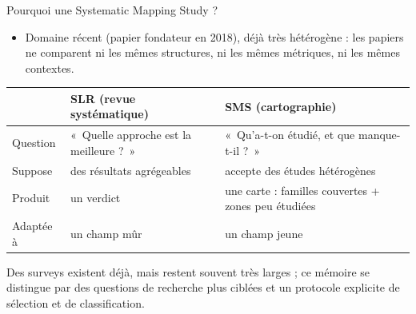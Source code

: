 \documentclass[10pt,aspectratio=169]{beamer}
\begin{document}
\begin{frame}{Pourquoi une Systematic Mapping Study ?}
  \begin{itemize}
    \item Domaine récent (papier fondateur en 2018), déjà très hétérogène : les papiers ne comparent ni les mêmes structures, ni les mêmes métriques, ni les mêmes contextes.
  \end{itemize}

  \vspace{0.35cm}
  \begin{center}
  \small
  \renewcommand{\arraystretch}{1.45}
  \setlength{\tabcolsep}{6pt}
  \begin{tabular}{>{\raggedright\arraybackslash}p{2.1cm}>{\raggedright\arraybackslash}p{4.4cm}>{\raggedright\arraybackslash}p{4.4cm}}
    \toprule
     & \textbf{SLR} {\footnotesize(revue systématique)} & \textbf{SMS} {\footnotesize(cartographie)} \\
    \midrule
    Question & «~Quelle approche est la meilleure ?~» & «~Qu'a-t-on étudié, et que manque-t-il ?~» \\
    Suppose & des résultats agrégeables & accepte des études hétérogènes \\
    Produit & un verdict & une carte : familles couvertes + zones peu étudiées \\
    Adaptée à & un champ mûr & un champ jeune \\
    \bottomrule
  \end{tabular}
  \end{center}

  \vspace{0.3cm}
  \footnotesize
  Des surveys existent déjà, mais restent souvent très larges ; ce mémoire se distingue par des questions de recherche plus ciblées et un protocole explicite de sélection et de classification.
\end{frame}
\end{document}
